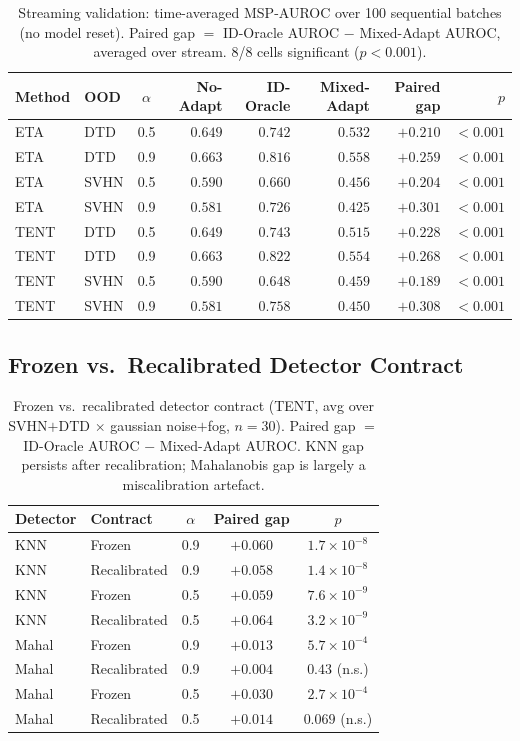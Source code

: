 \begin{table}[h]
\centering\small
\caption{%
  Streaming validation: time-averaged MSP-AUROC over 100 sequential batches (no model reset).
  Paired gap $=$ ID-Oracle AUROC $-$ Mixed-Adapt AUROC, averaged over stream.
  8/8 cells significant ($p < 0.001$).
}
\label{tab:streaming_app}
\begin{tabular}{llcrrrrr}
\toprule
Method & OOD & $\alpha$ & No-Adapt & ID-Oracle & Mixed-Adapt & Paired gap & $p$ \\
\midrule
ETA  & DTD  & 0.5 & $0.649$ & $0.742$ & $0.532$ & $+0.210$ & $<0.001$ \\
ETA  & DTD  & 0.9 & $0.663$ & $0.816$ & $0.558$ & $+0.259$ & $<0.001$ \\
ETA  & SVHN & 0.5 & $0.590$ & $0.660$ & $0.456$ & $+0.204$ & $<0.001$ \\
ETA  & SVHN & 0.9 & $0.581$ & $0.726$ & $0.425$ & $+0.301$ & $<0.001$ \\
TENT & DTD  & 0.5 & $0.649$ & $0.743$ & $0.515$ & $+0.228$ & $<0.001$ \\
TENT & DTD  & 0.9 & $0.663$ & $0.822$ & $0.554$ & $+0.268$ & $<0.001$ \\
TENT & SVHN & 0.5 & $0.590$ & $0.648$ & $0.459$ & $+0.189$ & $<0.001$ \\
TENT & SVHN & 0.9 & $0.581$ & $0.758$ & $0.450$ & $+0.308$ & $<0.001$ \\
\bottomrule
\end{tabular}
\end{table}

\subsection{Frozen vs.\ Recalibrated Detector Contract}

\begin{table}[h]
\centering\small
\caption{%
  Frozen vs.\ recalibrated detector contract (TENT, avg over SVHN$+$DTD $\times$ gaussian noise$+$fog, $n{=}30$).
  Paired gap $=$ ID-Oracle AUROC $-$ Mixed-Adapt AUROC.
  KNN gap persists after recalibration; Mahalanobis gap is largely a miscalibration artefact.
}
\label{tab:recalibration_app}
\begin{tabular}{llccc}
\toprule
Detector & Contract & $\alpha$ & Paired gap & $p$ \\
\midrule
KNN & Frozen       & 0.9 & $+0.060$ & $1.7\times10^{-8}$ \\
KNN & Recalibrated & 0.9 & $+0.058$ & $1.4\times10^{-8}$ \\
KNN & Frozen       & 0.5 & $+0.059$ & $7.6\times10^{-9}$ \\
KNN & Recalibrated & 0.5 & $+0.064$ & $3.2\times10^{-9}$ \\
\midrule
Mahal & Frozen       & 0.9 & $+0.013$ & $5.7\times10^{-4}$ \\
Mahal & Recalibrated & 0.9 & $+0.004$ & $0.43$ (n.s.) \\
Mahal & Frozen       & 0.5 & $+0.030$ & $2.7\times10^{-4}$ \\
Mahal & Recalibrated & 0.5 & $+0.014$ & $0.069$ (n.s.) \\
\bottomrule
\end{tabular}
\end{table}

